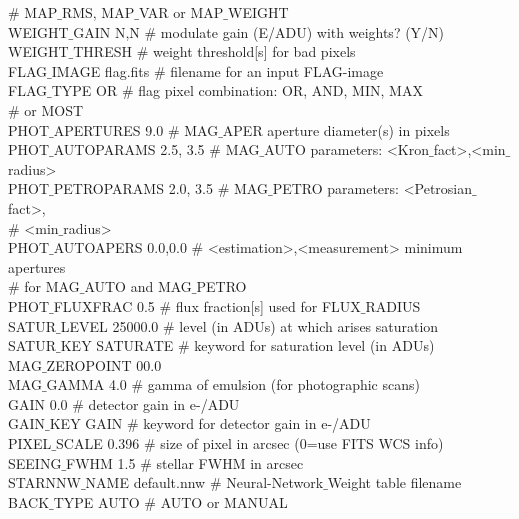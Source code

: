 \begin{tt}
                                $\#$ MAP$\_$RMS, MAP$\_$VAR or MAP$\_$WEIGHT\\
WEIGHT$\_$GAIN      N,N              $\#$ modulate gain (E/ADU) with weights? (Y/N)\\
WEIGHT$\_$THRESH                   $\#$ weight threshold[s] for bad pixels\\
FLAG$\_$IMAGE       flag.fits      $\#$ filename for an input FLAG-image\\
FLAG$\_$TYPE        OR             $\#$ flag pixel combination: OR, AND, MIN, MAX\\
                                $\#$ or MOST\\
PHOT$\_$APERTURES   9.0            $\#$ MAG$\_$APER aperture diameter(s) in pixels\\
PHOT$\_$AUTOPARAMS  2.5, 3.5       $\#$ MAG$\_$AUTO parameters: <Kron$\_$fact>,<min$\_$radius>\\
PHOT$\_$PETROPARAMS 2.0, 3.5       $\#$ MAG$\_$PETRO parameters: <Petrosian$\_$fact>,\\
                                $\#$ <min$\_$radius>\\
PHOT$\_$AUTOAPERS   0.0,0.0        $\#$ <estimation>,<measurement> minimum apertures\\
                                $\#$ for MAG$\_$AUTO and MAG$\_$PETRO\\
PHOT$\_$FLUXFRAC    0.5            $\#$ flux fraction[s] used for FLUX$\_$RADIUS\\
SATUR$\_$LEVEL      25000.0        $\#$ level (in ADUs) at which arises saturation\\
SATUR$\_$KEY        SATURATE       $\#$ keyword for saturation level (in ADUs)\\
MAG$\_$ZEROPOINT    00.0\\
MAG$\_$GAMMA        4.0            $\#$ gamma of emulsion (for photographic scans)\\
GAIN             0.0            $\#$ detector gain in e-/ADU\\
GAIN$\_$KEY         GAIN           $\#$ keyword for detector gain in e-/ADU\\
PIXEL$\_$SCALE      0.396            $\#$ size of pixel in arcsec (0=use FITS WCS info)\\
SEEING$\_$FWHM      1.5            $\#$ stellar FWHM in arcsec\\
STARNNW$\_$NAME     default.nnw    $\#$ Neural-Network$\_$Weight table filename\\
BACK$\_$TYPE        AUTO           $\#$ AUTO or MANUAL\\

\end{tt}
